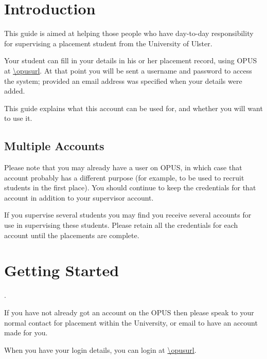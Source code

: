 \section{Introduction}

This guide is aimed at helping those people who have day-to-day responsibility
for supervising a placement student from the University of Ulster.

Your student can fill in your details in his or her placement record, using
OPUS at \url{\opusurl}. At that point you will be sent a username and
password to access the system; provided an email address was specified when
your details were added.

This guide explains what this account can be used for, and whether you will want
to use it.

\subsection{Multiple Accounts}

Please note that you may already have a user on OPUS, in which case that account
probably has a different purpose (for example, to be used to recruit students in the
first place). You should continue to keep the credentials for that account in addition
to your supervisor account.

If you supervise several students you may find you receive several accounts for use
in supervising these students. Please retain all the credentials for each account
until the placements are complete.

\section{Getting Started}.

If you have not already got an account on the OPUS then please speak to your normal contact
for placement within the University, or email
to have an account made for you.

When you have your login details, you can login at \url{\opusurl}.

